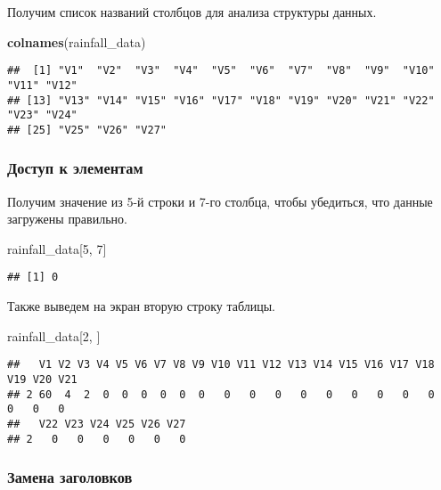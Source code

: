 \documentclass[
]{article}
\newenvironment{Shaded}{\begin{snugshade}}{\end{snugshade}}
\newcommand{\DecValTok}[1]{\textcolor[rgb]{0.00,0.00,0.81}{#1}}
\newcommand{\FunctionTok}[1]{\textcolor[rgb]{0.13,0.29,0.53}{\textbf{#1}}}
\newcommand{\NormalTok}[1]{#1}
\begin{document}
Получим список названий столбцов для анализа структуры данных.

\begin{Shaded}
\begin{Highlighting}[]
\FunctionTok{colnames}\NormalTok{(rainfall\_data)}
\end{Highlighting}
\end{Shaded}

\begin{verbatim}
##  [1] "V1"  "V2"  "V3"  "V4"  "V5"  "V6"  "V7"  "V8"  "V9"  "V10" "V11" "V12"
## [13] "V13" "V14" "V15" "V16" "V17" "V18" "V19" "V20" "V21" "V22" "V23" "V24"
## [25] "V25" "V26" "V27"
\end{verbatim}

\subsubsection{Доступ к
элементам}\label{ux434ux43eux441ux442ux443ux43f-ux43a-ux44dux43bux435ux43cux435ux43dux442ux430ux43c}

Получим значение из 5-й строки и 7-го столбца, чтобы убедиться, что
данные загружены правильно.

\begin{Shaded}
\begin{Highlighting}[]
\NormalTok{rainfall\_data[}\DecValTok{5}\NormalTok{, }\DecValTok{7}\NormalTok{]}
\end{Highlighting}
\end{Shaded}

\begin{verbatim}
## [1] 0
\end{verbatim}

Также выведем на экран вторую строку таблицы.

\begin{Shaded}
\begin{Highlighting}[]
\NormalTok{rainfall\_data[}\DecValTok{2}\NormalTok{, ]}
\end{Highlighting}
\end{Shaded}

\begin{verbatim}
##   V1 V2 V3 V4 V5 V6 V7 V8 V9 V10 V11 V12 V13 V14 V15 V16 V17 V18 V19 V20 V21
## 2 60  4  2  0  0  0  0  0  0   0   0   0   0   0   0   0   0   0   0   0   0
##   V22 V23 V24 V25 V26 V27
## 2   0   0   0   0   0   0
\end{verbatim}

\subsubsection{Замена
заголовков}\label{ux437ux430ux43cux435ux43dux430-ux437ux430ux433ux43eux43bux43eux432ux43aux43eux432}
\end{document}
